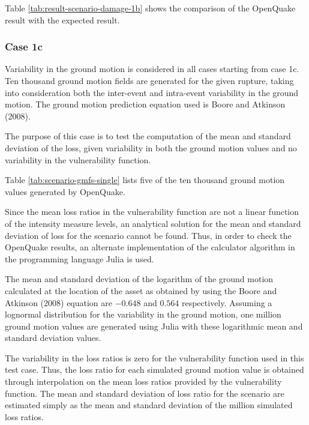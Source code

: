 Table \ref{tab:result-scenario-damage-1b} shows the comparison of the OpenQuake result with the expected result.

\subsubsection{Case 1c}
Variability in the ground motion is considered in all cases starting from case 1c. Ten thousand ground motion fields are generated for the given rupture, taking into consideration both the inter-event and intra-event variability in the ground motion. The ground motion prediction equation used is Boore and Atkinson (2008).

The purpose of this case is to test the computation of the mean and standard deviation of the loss, given variability in both the ground motion values and no variability in the vulnerability function.



Table \ref{tab:scenario-gmfs-single} lists five of the ten thousand ground motion values generated by OpenQuake.

Since the mean loss ratios in the vulnerability function are not a linear function of the intensity measure levels, an analytical solution for the mean and standard deviation of loss for the scenario cannot be found. Thus, in order to check the OpenQuake results, an alternate implementation of the calculator algorithm in the programming language Julia is used.

The mean and standard deviation of the logarithm of the ground motion calculated at the location of the asset as obtained by using the Boore and Atkinson (2008) equation are $-0.648$ and $0.564$ respectively. Assuming a lognormal distribution for the variability in the ground motion, one million ground motion values are generated using Julia with these logarithmic mean and standard deviation values.

The variability in the loss ratios is zero for the vulnerability function used in this test case. Thus, the loss ratio for each simulated ground motion value is obtained through interpolation on the mean loss ratios provided by the vulnerability function. The mean and standard deviation of loss ratio for the scenario are estimated simply as the mean and standard deviation of the million simulated loss ratios.



